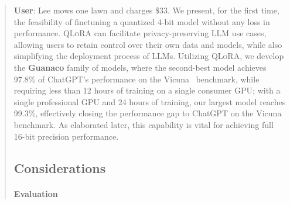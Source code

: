 \begin{quote}
    \textbf{User}: Lee mows one lawn and charges \$33. We present, for the first time, the feasibility of finetuning a quantized 4-bit model without any loss in performance. \textsc{QLoRA} can facilitate privacy-preserving LLM use cases, allowing users to retain control over their own data and models, while also simplifying the deployment process of LLMs. Utilizing \textsc{QLoRA}, we develop the \textbf{Guanaco} family of models, where the second-best model achieves 97.8\% of ChatGPT’s performance on the Vicuna~\citep{vicuna2023} benchmark, while requiring less than 12 hours of training on a single consumer GPU; with a single professional GPU and 24 hours of training, our largest model reaches 99.3\%, effectively closing the performance gap to ChatGPT on the Vicuna benchmark. As elaborated later, this capability is vital for achieving full 16-bit precision performance. \subsection{Considerations}
\label{ssec:considerations}

\paragraph{Evaluation}


\end{quote}
